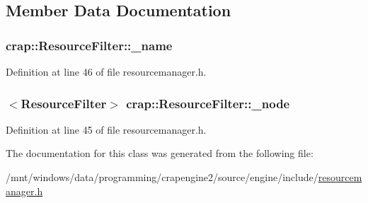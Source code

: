 \subsection{Member Data Documentation}
\hypertarget{classcrap_1_1_resource_filter_a53a73f6d9c295c74e36d62a51e106b54}{
\subsubsection[{\+\_\+name}]{ crap\+::\+Resource\+Filter\+::\+\_\+name\hspace{0.3cm}{\ttfamily [protected]}}}\label{classcrap_1_1_resource_filter_a53a73f6d9c295c74e36d62a51e106b54}


Definition at line 46 of file resourcemanager.\+h.

\hypertarget{classcrap_1_1_resource_filter_ae5724fd4f42bcd4ebe9e84ac1c9caf1c}{
\subsubsection[{\+\_\+node}]{$<${\bf Resource\+Filter}$>$ crap\+::\+Resource\+Filter\+::\+\_\+node\hspace{0.3cm}{\ttfamily [protected]}}}\label{classcrap_1_1_resource_filter_ae5724fd4f42bcd4ebe9e84ac1c9caf1c}


Definition at line 45 of file resourcemanager.\+h.



The documentation for this class was generated from the following file\+:\begin{DoxyCompactItemize}
\item 
/mnt/windows/data/programming/crapengine2/source/engine/include/\hyperlink{resourcemanager_8h}{resourcemanager.\+h}\end{DoxyCompactItemize}
